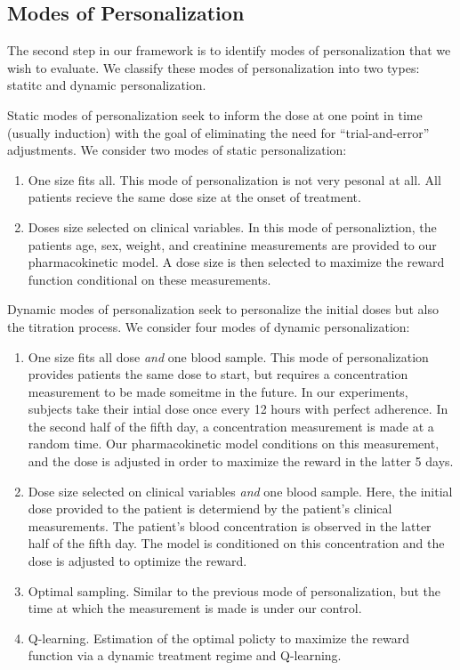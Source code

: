 \subsection{Modes of Personalization}

The second step in our framework is to identify modes of personalization that we wish to evaluate. We classify these modes of personalization into two types: statitc and dynamic personalization.

Static modes of personalization seek to inform the dose at one point in time (usually induction) with the goal of eliminating the need for ``trial-and-error'' adjustments.  We consider two modes of static personalization:

\begin{enumerate}
	\item One size fits all.  This mode of personalization is not very pesonal at all.  All patients recieve the same dose size at the onset of treatment.
	\item Doses size selected on clinical variables.  In this mode of personaliztion, the patients age, sex, weight, and creatinine measurements are provided to our pharmacokinetic model.  A dose size is then selected to maximize the reward function conditional on these measurements.
\end{enumerate}

Dynamic modes of personalization seek to personalize the initial doses but also the titration process.  We consider four modes of dynamic personalization:

\begin{enumerate}
	\item One size fits all dose \textit{and} one blood sample.  This mode of personalization provides patients the same dose to start, but requires a concentration measurement to be made someitme in the future.  In our experiments, subjects take their intial dose once every 12 hours with perfect adherence.  In the second half of the fifth day, a concentration measurement is made at a random time.  Our pharmacokinetic model conditions on this measurement, and the dose is adjusted in order to maximize the reward in the latter 5 days.
	
	\item Dose size selected on clinical variables \textit{and} one blood sample.  Here, the initial dose provided to the patient is determiend by the patient's clinical measurements.  The patient's blood concentration is observed in the latter half of the fifth day.  The model is conditioned on this concentration and the dose is adjusted to optimize the reward.
	
	\item Optimal sampling.  Similar to the previous mode of personalization, but the time at which the measurement is made is under our control.
	
	\item Q-learning. Estimation of the optimal policty to maximize the reward function via a dynamic treatment regime and Q-learning.
\end{enumerate}

